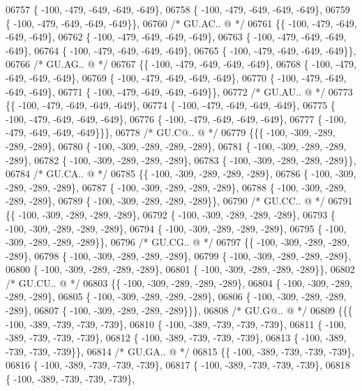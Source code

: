 \begin{DoxyCode}
06757 \{ -100, -479, -649, -649, -649\},
06758 \{ -100, -479, -649, -649, -649\},
06759 \{ -100, -479, -649, -649, -649\}\},
06760 \textcolor{comment}{/* GU.AC.. @ */}
06761 \{\{ -100, -479, -649, -649, -649\},
06762 \{ -100, -479, -649, -649, -649\},
06763 \{ -100, -479, -649, -649, -649\},
06764 \{ -100, -479, -649, -649, -649\},
06765 \{ -100, -479, -649, -649, -649\}\},
06766 \textcolor{comment}{/* GU.AG.. @ */}
06767 \{\{ -100, -479, -649, -649, -649\},
06768 \{ -100, -479, -649, -649, -649\},
06769 \{ -100, -479, -649, -649, -649\},
06770 \{ -100, -479, -649, -649, -649\},
06771 \{ -100, -479, -649, -649, -649\}\},
06772 \textcolor{comment}{/* GU.AU.. @ */}
06773 \{\{ -100, -479, -649, -649, -649\},
06774 \{ -100, -479, -649, -649, -649\},
06775 \{ -100, -479, -649, -649, -649\},
06776 \{ -100, -479, -649, -649, -649\},
06777 \{ -100, -479, -649, -649, -649\}\}\},
06778 \textcolor{comment}{/* GU.C@.. @ */}
06779 \{\{\{ -100, -309, -289, -289, -289\},
06780 \{ -100, -309, -289, -289, -289\},
06781 \{ -100, -309, -289, -289, -289\},
06782 \{ -100, -309, -289, -289, -289\},
06783 \{ -100, -309, -289, -289, -289\}\},
06784 \textcolor{comment}{/* GU.CA.. @ */}
06785 \{\{ -100, -309, -289, -289, -289\},
06786 \{ -100, -309, -289, -289, -289\},
06787 \{ -100, -309, -289, -289, -289\},
06788 \{ -100, -309, -289, -289, -289\},
06789 \{ -100, -309, -289, -289, -289\}\},
06790 \textcolor{comment}{/* GU.CC.. @ */}
06791 \{\{ -100, -309, -289, -289, -289\},
06792 \{ -100, -309, -289, -289, -289\},
06793 \{ -100, -309, -289, -289, -289\},
06794 \{ -100, -309, -289, -289, -289\},
06795 \{ -100, -309, -289, -289, -289\}\},
06796 \textcolor{comment}{/* GU.CG.. @ */}
06797 \{\{ -100, -309, -289, -289, -289\},
06798 \{ -100, -309, -289, -289, -289\},
06799 \{ -100, -309, -289, -289, -289\},
06800 \{ -100, -309, -289, -289, -289\},
06801 \{ -100, -309, -289, -289, -289\}\},
06802 \textcolor{comment}{/* GU.CU.. @ */}
06803 \{\{ -100, -309, -289, -289, -289\},
06804 \{ -100, -309, -289, -289, -289\},
06805 \{ -100, -309, -289, -289, -289\},
06806 \{ -100, -309, -289, -289, -289\},
06807 \{ -100, -309, -289, -289, -289\}\}\},
06808 \textcolor{comment}{/* GU.G@.. @ */}
06809 \{\{\{ -100, -389, -739, -739, -739\},
06810 \{ -100, -389, -739, -739, -739\},
06811 \{ -100, -389, -739, -739, -739\},
06812 \{ -100, -389, -739, -739, -739\},
06813 \{ -100, -389, -739, -739, -739\}\},
06814 \textcolor{comment}{/* GU.GA.. @ */}
06815 \{\{ -100, -389, -739, -739, -739\},
06816 \{ -100, -389, -739, -739, -739\},
06817 \{ -100, -389, -739, -739, -739\},
06818 \{ -100, -389, -739, -739, -739\},

\end{DoxyCode}
